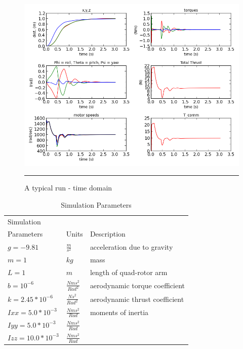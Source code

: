 \begin{figure}[htbp]
	\centering
		\includegraphics[width=\textwidth]{Figures/typical_run_time_domain.png}
		\rule{35em}{0.5pt}
	\caption[Typical Run Time Domain]{A typical run - time domain}
	\label{fig:Typical Run Time Domain}
\end{figure}


\begin{table}
\label{table:params}
\begin{doublespace}
\centering
\begin{tabular}{l l l}
    Simulation\\ Parameters & Units & Description\\
    \hline
    $g = -9.81            $& $ \frac{m}{s^2}          $ & acceleration due to gravity\\
    $m = 1                $& $ kg                      $ & mass\\
    $L = 1                $& $ m                       $ & length of quad-rotor arm\\
    $b = 10^{-6}          $& $ \frac{N m s^2}{Rad^2}  $ & aerodynamic torque coefficient\\
    $k = 2.45*10^{-6}     $& $ \frac{N s^2}{Rad^2}    $ & aerodynamic thrust coefficient\\
    $Ixx = 5.0*10^{-3}    $& $ \frac{N m s^2}{Rad}    $ & moments of inertia \\
    $Iyy = 5.0*10^{-3}    $& $ \frac{N m s^2}{Rad}    $ & \\
    $Izz = 10.0*10^{-3}   $& $ \frac{N m s^2}{Rad}    $ & \\
    \hline
\end{tabular}
\caption[Simulation Parameters]{Simulation Parameters}
\end{doublespace}
\end{table}

